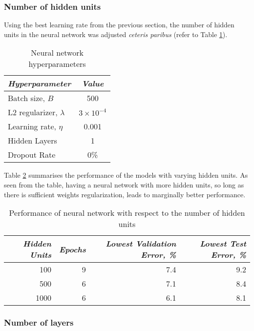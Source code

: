 \documentclass[a4paper,12pt]{article}
\begin{document}
\subsubsection{Number of hidden units}
Using the best learning rate from the previous section, the number of hidden units in the neural network was adjusted \textit{ceteris paribus} (refer to Table \ref{table:NN_HParam_2_3_1}).

\begin{table}[!htb]
\centering
\caption{Neural network hyperparameters}
\label{table:NN_HParam_2_3_1}
\vspace{0.5em}
\begin{tabular}{|l|c|} \hline
\textit{Hyperparameter} & \textit{Value} \\ \hline
Batch size, $B$ & 500 \\
L2 regularizer, $\lambda$ & $3 \times 10^{-4}$  \\
Learning rate, $\eta$ & 0.001 \\
Hidden Layers & 1 \\
Dropout Rate & 0\% \\
\hline
\end{tabular}
\end{table}

Table \ref{table:NN_NumUnits} summarises the performance of the models with varying hidden units. As seen from the table, having a neural network with more hidden units, so long as there is sufficient weights regularization, leads to marginally better performance.

\begin{table}[!htb]
\centering
\caption{Performance of neural network with respect to the number of hidden units}
\label{table:NN_NumUnits}
\vspace{0.5em}
\begin{tabular}{|r|r r r|} \hline
\textit{Hidden Units} & \textit{Epochs} & \textit{Lowest Validation Error, \%} & \textit{Lowest Test Error, \%} \\ \hline
100 & 9 & 7.4 & 9.2 \\
500 & 6 & 7.1 & 8.4 \\
1000 & 6 & 6.1 & 8.1 \\
\hline
\end{tabular}
\end{table}

\clearpage
\subsubsection{Number of layers}
\end{document}
